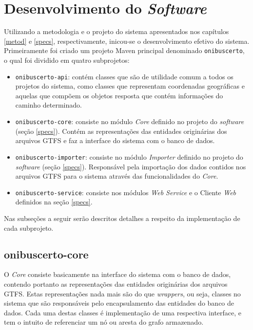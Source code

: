 \chapter{Desenvolvimento do \emph{Software}}
\label{chap:desenv}

Utilizando a metodologia e o projeto do sistema apresentados nos capítulos \ref{metod} e \ref{specs}, respectivamente, inicou-se o desenvolvimento efetivo do sistema.
Primeiramente foi criado um projeto Maven principal denominado \texttt{onibuscerto}, o qual foi dividido em quatro subprojetos: 
\begin{itemize}
	\item \texttt{onibuscerto-api}: contém classes que são de utilidade comum a todos os projetos do sistema, como classes que representam coordenadas geográficas e aquelas que compõem os objetos resposta que contém informações do caminho determinado.
	\item \texttt{onibuscerto-core}: consiste no módulo \emph{Core} definido no projeto do \emph{software} (seção \ref{specs}). 
	Contém as representações das entidades originárias dos arquivos GTFS e faz a interface do sistema com o banco de dados.
	\item \texttt{onibuscerto-importer}: consiste no módulo \emph{Importer} definido no projeto do \emph{software} (seção \ref{specs}).
	Responsável pela importação dos dados contidos nos arquivos GTFS para o sistema através das funcionalidades do \emph{Core}.
	\item \texttt{onibuscerto-service}: consiste nos módulos \emph{Web Service} e o Cliente \emph{Web} definidos na seção \ref{specs}.
\end{itemize}

Nas subseções a seguir serão descritos detalhes a respeito da implementação de cada subprojeto.


\section{onibuscerto-core}

O \emph{Core} consiste basicamente na interface do sistema com o banco de dados, contendo portanto as representações das entidades originárias dos arquivos GTFS.
Estas representações nada mais são do que \emph{wrappers}, ou seja, classes no sistema que são responsáveis pelo encapsulamento das entidades do banco de dados.
Cada uma destas classes é implementação de uma respectiva interface, e tem o intuito de referenciar um nó ou aresta do grafo armazenado.

